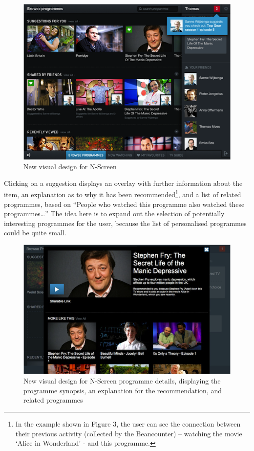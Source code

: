 \documentclass{notube}
\begin{document}
 \begin{figure}[htbp]
\begin{center}
\includegraphics[width=6in]{images/ns_new.png}
\caption{New visual design for N-Screen} \label{fig:nsnew}
\end{center}
\end{figure}

Clicking on a suggestion displays an overlay with further information about the item, an explanation as to why it has been recommended\footnote{In the example shown in Figure 3, the user can see the connection between their previous activity (collected by the Beancounter) – watching the movie `Alice in Wonderland’ - and this programme.}, and a list of related programmes, based on ``People who watched this programme also watched these programmes…” The idea here is to expand out the selection of potentially interesting programmes for the user, because the list of personalised programmes could be quite small.

\begin{figure}[htbp]
\begin{center}
\includegraphics[width=6in]{images/fry.png}
\caption{New visual design for N-Screen programme details, displaying the programme synopsis, an explanation for the recommendation, and related programmes} \label{fig:fry}
\end{center}
\end{figure}
\end{document}
